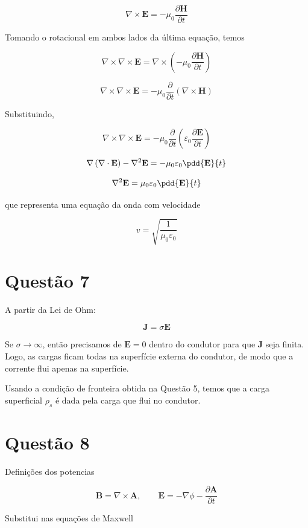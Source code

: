 \[ \nabla \times \mathbf{E} = -\mu_0 \frac{\partial \mathbf{H}}{\partial t} \]

Tomando o rotacional em ambos lados da última equação, temos

\[ \nabla \times \nabla \times \mathbf{E} = \nabla \times \left( -\mu_0 \frac{\partial \mathbf{H}}{\partial t} \right)  \]

\[ \nabla \times \nabla \times \mathbf{E} = -\mu_0 \frac{\partial }{\partial t} \left( \nabla \times \mathbf{H} \right)  \]

Substituindo,

\[ \nabla \times \nabla \times \mathbf{E} = -\mu_0 \frac{\partial }{\partial t} \left( \varepsilon_0 \frac{\partial \mathbf{E}}{\partial t} \right)  \]

\[ \nabla \left( \nabla \cdot \mathbf{E} \right) - \nabla^2 \mathbf{E} = -\mu_0 \varepsilon_0  \pdd{\mathbf{E}}{t}  \]

\[ \nabla^2 \mathbf{E} = \mu_0 \varepsilon_0 \pdd{\mathbf{E}}{t} \]

\noindent que representa uma equação da onda com velocidade 

\[ v = \sqrt{\frac{1}{\mu_0 \varepsilon_0}} \]

\chapter{Questão 7}\label{cap:q7}

A partir da Lei de Ohm:

\[
\mathbf{J} = \sigma \mathbf{E}
\]

Se $\sigma \to \infty$, então precisamos de $\mathbf{E} = 0 $
dentro do condutor para 
que $\mathbf{J}$ seja finita. Logo, as cargas ficam todas na superfície 
externa do condutor, de modo que a corrente flui apenas na superfície. 

Usando a condição de fronteira obtida na Questão 5,
temos que a carga superficial $\rho_s$ é dada pela 
carga que flui no condutor.

\chapter{Questão 8}\label{cap:q8}

Definições dos potencias

\[
\mathbf{B} = \nabla \times \mathbf{A}, \qquad
\mathbf{E} = -\nabla \phi - \frac{\partial \mathbf{A}}{\partial t}
\]

Substitui nas equações de Maxwell

